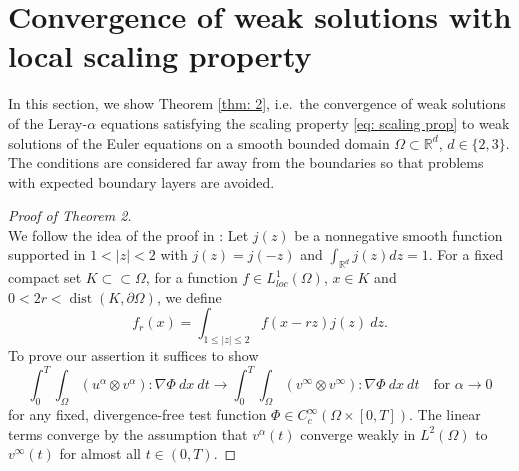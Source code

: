 \documentclass{amsart}
\begin{document}
\section{Convergence of weak solutions with local scaling property}
\label{subsection: scaling limit}
In this section, we show Theorem \ref{thm: 2}, i.e.\ the convergence of weak solutions of the Leray-$\alpha$ equations satisfying the scaling property \eqref{eq: scaling prop} to weak solutions of the Euler equations on a smooth bounded domain $\Omega \subset \mathbb{R}^d$, $d\in \{2,3\}$. The conditions are considered far away from the boundaries so that problems with expected boundary layers are avoided.
\begin{proof}[Proof of Theorem 2]\ \\
We follow the idea of the proof in \cite{Constantin.2018}: Let $j(z)$ be a nonnegative smooth function supported in $1<|z|<2$ with $j(z)=j(-z)$ and $\int_{\mathbb{R}^d} j(z) dz = 1$. For a fixed compact set $K \subset \subset \Omega$, for a function $f\in L^1_{loc}(\Omega)$, $x\in K$ and $0<2r<\operatorname{dist}(K,\partial\Omega)$, we define
\begin{equation}
    \label{v_r}
    f_r(x) = \int_{1\leq|z|\leq2} f(x-rz)j(z) \ dz.
\end{equation}
To prove our assertion it suffices to show
\begin{equation}
\label{to prove N}
    \int_0^T \int_{\Omega} (u^{\alpha} \otimes v^{\alpha}) : \nabla \Phi \ dx \ dt \to \int_0^T \int_{\Omega} (v^{\infty} \otimes v^{\infty}) : \nabla \Phi \ dx \ dt \ \ \ \text{ for } \alpha \to 0
\end{equation}
for any fixed, divergence-free test function $\Phi \in C^{\infty}_c(\Omega \times [0,T])$. The linear terms converge by the assumption that $v^{\alpha}(t)$ converge weakly in $L^2(\Omega)$ to $v^{\infty}(t)$ for almost all $t\in (0,T)$.


\end{proof}
\end{document}
